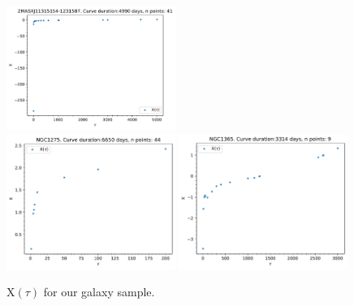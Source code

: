 \begin{figure}
\begin{center}
{  \includegraphics[width=0.49\textwidth]{Figs/Chapter5/X_tau_2MASXJ11315154-1231587.pdf} \\
  \includegraphics[width=0.49\textwidth]{Figs/Chapter5/X_tau_NGC1275.pdf} \hfill 
  \includegraphics[width=0.49\textwidth]{Figs/Chapter5/X_tau_NGC1365.pdf} 
  \caption{X$(\tau)$ for our galaxy sample.}
    \label{fig:Xtau_1}
  }
\end{center}
\end{figure}

